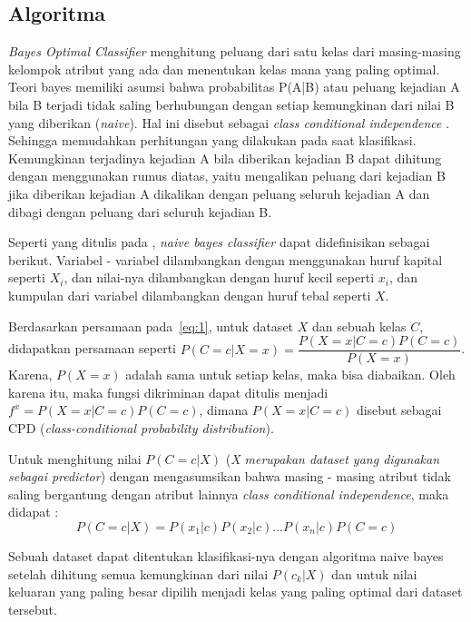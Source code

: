 \subsection{Algoritma}

	 \textit{Bayes Optimal Classifier} menghitung peluang dari satu kelas dari masing-masing kelompok atribut yang ada dan menentukan kelas mana yang paling optimal. Teori bayes memiliki asumsi bahwa probabilitas P(A|B) atau peluang kejadian A bila B terjadi tidak saling berhubungan dengan setiap kemungkinan dari nilai B yang diberikan (\textit{naive}). Hal ini disebut sebagai \textit{class conditional independence} . Sehingga memudahkan perhitungan yang dilakukan pada saat klasifikasi. Kemungkinan terjadinya kejadian A bila diberikan kejadian B dapat dihitung dengan menggunakan rumus diatas, yaitu mengalikan peluang dari kejadian B jika diberikan kejadian A dikalikan dengan peluang seluruh kejadian A dan dibagi dengan peluang dari seluruh kejadian B.

	Seperti yang ditulis pada \cite{rish2001empirical}, \textit{naive bayes classifier} dapat didefinisikan sebagai berikut. Variabel - variabel dilambangkan dengan menggunakan huruf kapital seperti $X_i$, dan nilai-nya dilambangkan dengan huruf kecil seperti $x_i$, dan kumpulan dari variabel dilambangkan dengan huruf tebal seperti \textbf{$X$}.

Berdasarkan persamaan pada~\ref{eq:1}, untuk dataset $X$ dan sebuah kelas $C$, didapatkan persamaan seperti $P(C=c|X=x) = \dfrac{P(X=x|C=c)P(C=c)}{P(X=x)}$. Karena, $P(X=x)$ adalah sama untuk setiap kelas, maka bisa diabaikan. Oleh karena itu, maka fungsi dikriminan dapat ditulis menjadi $f^x = P(X=x|C=c)P(C=c)$, dimana $P(X=x|C=c)$ disebut sebagai CPD (\textit{class-conditional probability distribution}).

Untuk menghitung nilai $P(C=c|X)$ (\textit{X merupakan dataset yang digunakan sebagai predictor}) dengan mengasumsikan bahwa masing - masing atribut tidak saling bergantung dengan atribut lainnya \textit{class conditional independence}, maka didapat : 
\begin{equation}
	P(C=c|X) = P(x_1|c) P(x_2|c) ... P(x_n|c) P(C=c)
\end{equation}

Sebuah dataset dapat ditentukan klasifikasi-nya dengan algoritma naive bayes setelah dihitung semua kemungkinan dari nilai $P(c_k|X)$ dan untuk nilai keluaran yang paling besar dipilih menjadi kelas yang paling optimal dari dataset tersebut.

